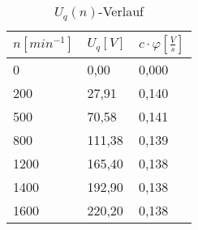 \begin{table}[htbp]
  \centering
  \begin{tabularx}{\columnwidth}{XXX}
    \toprule
    $n[min^{-1}]$ & $U_q[V]$ & $c\cdot{\varphi}[\frac{V}{s}]$ \\
    \midrule
    0             & 0,00     & 0,000                           \\
    200           & 27,91    & 0,140                           \\
    500           & 70,58    & 0,141                           \\
    800           & 111,38   & 0,139                           \\
    1200          & 165,40   & 0,138                           \\
    1400          & 192,90   & 0,138                           \\
    1600          & 220,20   & 0,138                           \\
    \bottomrule
  \end{tabularx}
  \caption{$U_q(n)$-Verlauf}
\end{table}
